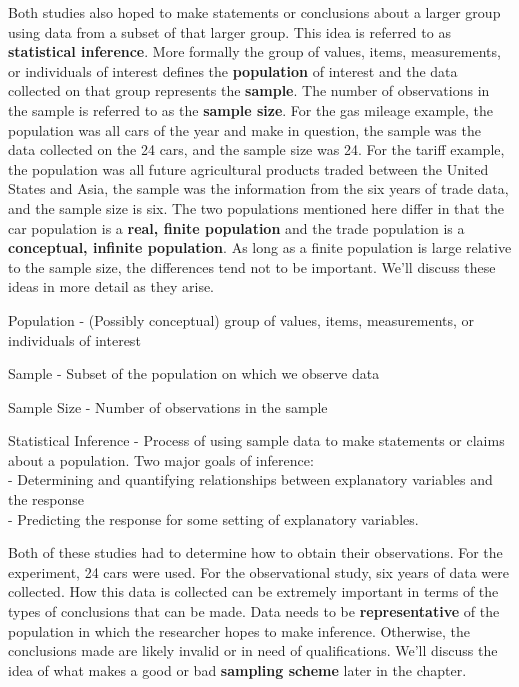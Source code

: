 \documentclass[
]{book}
\theoremstyle{definition}
\theoremstyle{definition}
\theoremstyle{definition}
\theoremstyle{remark}
\let\BeginKnitrBlock\begin \let\EndKnitrBlock\end
\begin{document}
Both studies also hoped to make statements or conclusions about a larger group using data from a subset of that larger group. This idea is referred to as \textbf{statistical inference}. More formally the group of values, items, measurements, or individuals of interest defines the \textbf{population} of interest and the data collected on that group represents the \textbf{sample}. The number of observations in the sample is referred to as the \textbf{sample size}. For the gas mileage example, the population was all cars of the year and make in question, the sample was the data collected on the 24 cars, and the sample size was 24. For the tariff example, the population was all future agricultural products traded between the United States and Asia, the sample was the information from the six years of trade data, and the sample size is six. The two populations mentioned here differ in that the car population is a \textbf{real, finite population} and the trade population is a \textbf{conceptual, infinite population}. As long as a finite population is large relative to the sample size, the differences tend not to be important. We'll discuss these ideas in more detail as they arise.

\BeginKnitrBlock{definition}
Population - (Possibly conceptual) group of values, items, measurements, or individuals of interest
\EndKnitrBlock{definition}

\BeginKnitrBlock{definition}
Sample - Subset of the population on which we observe data

Sample Size - Number of observations in the sample
\EndKnitrBlock{definition}

\BeginKnitrBlock{definition}
Statistical Inference - Process of using sample data to make statements or claims about a population. Two major goals of inference:\\
- Determining and quantifying relationships between explanatory variables and the response\\
- Predicting the response for some setting of explanatory variables.
\EndKnitrBlock{definition}

Both of these studies had to determine how to obtain their observations. For the experiment, 24 cars were used. For the observational study, six years of data were collected. How this data is collected can be extremely important in terms of the types of conclusions that can be made. Data needs to be \textbf{representative} of the population in which the researcher hopes to make inference. Otherwise, the conclusions made are likely invalid or in need of qualifications. We'll discuss the idea of what makes a good or bad \textbf{sampling scheme} later in the chapter.
\end{document}
